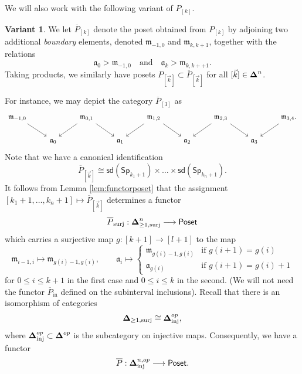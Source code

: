 \documentclass[10pt, reqno, twoside
, final
]{amsart}
\numberwithin{equation}{subsection}%
\theoremstyle{definition}
\theoremstyle{definition}
\theoremstyle{definition}
\theoremstyle{definition}
\theoremstyle{definition}
\theoremstyle{definition}
\theoremstyle{definition}
\newtheorem{var}[defn]{Variant}
\theoremstyle{definition}
\theoremstyle{definition}
\theoremstyle{plain}
\theoremstyle{definition}
\theoremstyle{plain}
\theoremstyle{definition}
\theoremstyle{plain}
\theoremstyle{definition}
\theoremstyle{definition}
\theoremstyle{plain}
\theoremstyle{plain}
\theoremstyle{definition}
\theoremstyle{plain}
\theoremstyle{plain}
\theoremstyle{plain}
\begin{document}
We will also work with the following variant of $P_{[k]}$.
\begin{var}
We let $\overline{P}_{[k]}$ denote the poset obtained from $P_{[k]}$ by adjoining two additional \emph{boundary} elements, denoted $\mathfrak{m}_{-1,0}$ and $\mathfrak{m}_{k,k+1}$, together with the relations 
\[  \mathfrak{a}_0>\mathfrak{m}_{-1,0} \quad\text{and}\quad \mathfrak{a}_k>\mathfrak{m}_{k,k++1}.  \]
Taking products, we similarly have posets $P_{[\vec{k}]}\subset \overline{P}_{[\vec{k}]}$ for all $[\vec{k}]\in \boldsymbol{\Delta}^n$.    
\end{var}
For instance, we may depict the category $\overline{P}_{[3]}$ as
\[
\begin{tikzcd}
\mathfrak{m}_{-1,0}\ar[dr]&& \mathfrak{m}_{0,1} \ar[dr]\ar[dl] &&   \mathfrak{m}_{1,2} \ar[dr]\ar[dl]   && \mathfrak{m}_{2,3} \ar[dr]\ar[dl] && \mathfrak{m}_{3,4}.\ar[dl]  \\
&\mathfrak{a}_0 &&\mathfrak{a}_1 &&\mathfrak{a}_2 &&\mathfrak{a}_3 
\end{tikzcd}
\]
Note that we have a canonical identification 
\[  \overline{P}_{[\vec{k}]} \cong \mathsf{sd}(\mathsf{Sp}_{k_1+1})\times \ldots \times \mathsf{sd}(\mathsf{Sp}_{k_n+1}).   \]
It follows from Lemma \ref{lem:functorposet} that the assignment $[k_1+1,\ldots,k_n+1]\mapsto \overline{P}_{[\vec{k}]}$ determines a functor 
\[ \overline{P}_{\mathrm{surj}}:\boldsymbol{\Delta}^n_{\geq 1,\mathrm{surj}}\longrightarrow \mathsf{Poset}  \]
which carries a surjective map $g:[k+1]\rightarrow [l+1]$ to the map 
\begin{equation}\label{eq:posetfunctor2.5}
\mathfrak{m}_{i-1,i}\longmapsto \mathfrak{m}_{g(i)-1,g(i)},\quad \quad \mathfrak{a}_{i}\longmapsto \begin{cases}
   \mathfrak{m}_{g(i)-1,g(i)}& \text{if } g(i+1)=g(i) \\
    \mathfrak{a}_{g(i)} & \text{if } g(i+1)=g(i)+1 
\end{cases}
\end{equation} 
for $0\leq i\leq k+1$ in the first case and $0\leq i\leq k$ in the second.
(We will not need the functor $\overline{P}_{\mathrm{in}}$ defined on the subinterval inclusions). Recall that there is an isomorphism of categories
\[  \boldsymbol{\Delta}_{\geq 1,\mathrm{surj}} \cong\boldsymbol{\Delta}^{op}_{\mathrm{inj}}, \]
where $\boldsymbol{\Delta}^{op}_{\mathrm{inj}}\subset \boldsymbol{\Delta}^{op}$ is the subcategory on injective maps. Consequently, we have a functor
\begin{equation}\label{eq:posetfunctor3} \overline{P}:\boldsymbol{\Delta}^{n,op}_{\mathrm{inj}}\longrightarrow \mathsf{Poset}. \end{equation}
\end{document}
